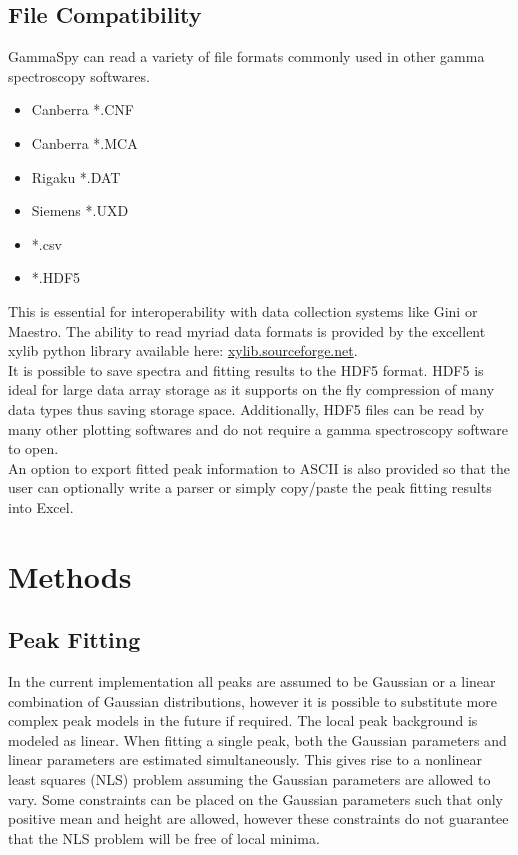 \documentclass[10pt]{article}
\begin{document}
\subsection{File Compatibility}
GammaSpy can read a variety of file formats commonly used in other gamma spectroscopy softwares.
\begin{itemize}
    \item Canberra *.CNF
    \item Canberra *.MCA
    \item Rigaku *.DAT
    \item Siemens *.UXD
    \item *.csv
    \item *.HDF5
\end{itemize}
This is essential for interoperability with data collection systems like Gini
or Maestro.  The ability to read myriad data formats is provided by the
excellent xylib python library available here: \url{xylib.sourceforge.net}. \\

It is possible to save spectra and fitting results to the HDF5 format.  HDF5 is
ideal for large data array storage as it supports on the fly compression of
many data types thus saving storage space.  Additionally, HDF5 files can be
read by many other plotting softwares and do not require a gamma spectroscopy
software to open. \\

An option to export fitted peak information to ASCII is also provided so that
the user can optionally write a parser or simply copy/paste the peak fitting
results into Excel. \\

\section{Methods}

\subsection{Peak Fitting}

In the current implementation all peaks are assumed to be Gaussian or a linear
combination of Gaussian distributions, however it is possible to substitute
more complex peak models in the future if required.  The local peak background
is modeled as linear.  When fitting a single peak, both the Gaussian parameters
and linear parameters are estimated simultaneously.  This gives rise to a
nonlinear least squares (NLS) problem assuming the Gaussian parameters are
allowed to vary.  Some constraints can be placed on the Gaussian parameters
such that only positive mean and height are allowed, however these constraints
do not guarantee that the NLS problem will be free of local minima.
\end{document}
